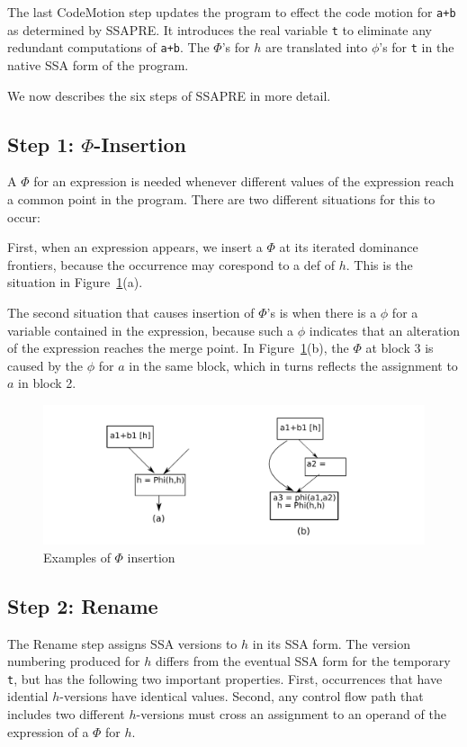The last CodeMotion step updates the program to effect the code motion for
{\tt a+b} as determined by SSAPRE.  It introduces the real variable {\tt t}
to eliminate any redundant computations of {\tt a+b}.  The $\Phi$'s for $h$
are translated into $\phi$'s for {\tt t} in the native SSA form of the
program.

We now describes the six steps of SSAPRE in more detail.

\subsection{Step 1: $\Phi$-Insertion}

A $\Phi$ for an expression is needed whenever different values of the
expression reach a common point in the program.  There are two different
situations for this to occur:

First, when an expression appears, we insert a $\Phi$ at its iterated
dominance frontiers, because the occurrence may corespond to a def of $h$.
This is the situation in Figure~\ref{fig: phi-insertion}(a).

The second situation that causes insertion of $\Phi$'s is when there is a
$\phi$ for a variable contained in the expression, because such a $\phi$
indicates that an alteration of the expression reaches the merge point.
In Figure~\ref{fig: phi-insertion}(b), the $\Phi$ at block 3 is caused by
the $\phi$ for $a$ in the same block, which in turns reflects the
assignment to $a$ in block 2.

\begin{figure}
\centering
\includegraphics[scale=0.55]{fig-phi-insertion.pdf}
\caption{Examples of $\Phi$ insertion}
\label{fig: phi-insertion}
\end{figure}

\subsection{Step 2: Rename}

The Rename step assigns SSA versions to $h$ in its SSA form.  The version 
numbering produced for $h$ differs from the eventual SSA form for the 
temporary {\tt t}, but has the following two important properties.  First,
occurrences that have idential $h$-versions have identical values.  Second,
any control flow path that includes two different $h$-versions must cross an
assignment to an operand of the expression of a $\Phi$ for $h$.

